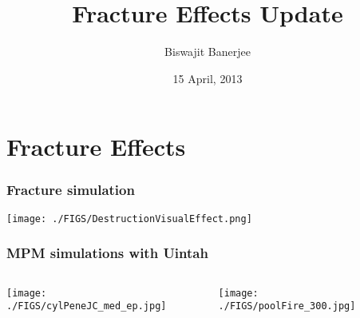 \documentclass[a4paper]{beamer}
\title[Fracture Effects]
{Fracture Effects Update}
\author{Biswajit Banerjee}
\date[15 April, 2013]{15 April, 2013}
\begin{document}
  \begin{frame}
    \titlepage
  \end{frame}


  \section{Fracture Effects}

    \begin{frame}
      \frametitle{Fracture simulation}
      \begin{center}
      \texttt{[image: ./FIGS/DestructionVisualEffect.png]} 
      \end{center}
    \end{frame}

    \begin{frame}
      \frametitle{MPM simulations with Uintah}
      \begin{columns}
        \begin{column}{0.3\textwidth}
          \begin{center}
            \texttt{[image: ./FIGS/cylPeneJC\_med\_ep.jpg]} 
          \end{center}
        \end{column}
        \begin{column}{0.25\textwidth}
          \begin{center}
            \texttt{[image: ./FIGS/poolFire\_300.jpg]} 
          \end{center}
        \end{column}
        \begin{column}{0.45\textwidth}
          \begin{center}
             \\
          \end{center}
        \end{column}
      \end{columns}
    \end{frame}
\end{document}
